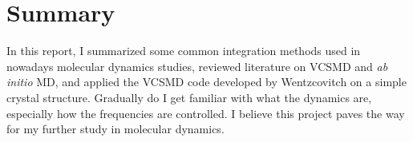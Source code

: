 
\section{Summary}

In this report, I summarized some common integration methods used in nowadays
molecular dynamics studies, reviewed literature on VCSMD and \textit{ab initio} MD,
and applied the VCSMD code developed by Wentzcovitch on a simple crystal structure.
Gradually do I get familiar with what the dynamics are, especially how the frequencies are controlled. I believe this project paves the way for my further study in molecular dynamics.
